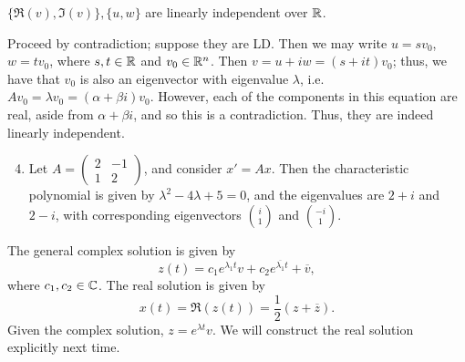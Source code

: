 \begin{simpleclaim}
    $\{\Re(v), \Im(v)\}, \{u, w\}$ are linearly independent over $\mathbb R$.
\end{simpleclaim}
\noindent Proceed by contradiction; suppose they are LD. Then we may write $u = s v_0$, $w = t v_0$, where $s, t \in \mathbb R$ and $v_0 \in \mathbb R^n$. Then $v = u + iw = (s + it) v_0$; thus, we have that $v_0$ is also an eigenvector with eigenvalue $\lambda$, i.e. $A v_0 = \lambda v_0 = (\alpha + \beta i) v_0$. However, each of the components in this equation are real, aside from $\alpha + \beta i$, and so this is a contradiction. Thus, they are indeed linearly independent.
\begin{enumerate}[label=(\alph*)]
    \setcounter{enumi}{3}
    \item Let $A = \begin{pmatrix} 2 & -1 \\ 1 & 2 \end{pmatrix}$, and consider $x' = Ax$. Then the characteristic polynomial is given by $\lambda^2 - 4 \lambda + 5 = 0$, and the eigenvalues are $2 + i$ and $2 - i$, with corresponding eigenvectors $\binom{i}{1}$ and $\binom{-i}{1}$.
\end{enumerate}
The general complex solution is given by
\[ z(t) = c_1 e^{\lambda_1 t} v + c_2 e^{\overline{\lambda_1} t} + \overline{v}, \]
where $c_1, c_2 \in \mathbb C$. The real solution is given by
\[ x(t) = \Re(z(t)) = \frac{1}{2}(z + \overline{z}). \]
Given the complex solution, $z = e^{\lambda t} v$. We will construct the real solution explicitly next time.